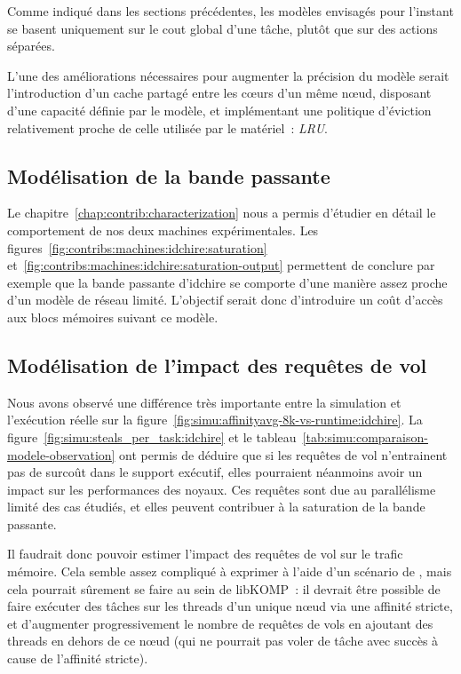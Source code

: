 Comme indiqué dans les sections précédentes, les modèles envisagés pour l'instant se basent uniquement sur le cout global d'une tâche, plutôt que sur des actions séparées.

L'une des améliorations nécessaires pour augmenter la précision du modèle serait l'introduction d'un cache partagé entre les cœurs d'un même nœud, disposant d'une capacité définie par le modèle, et implémentant une politique d'éviction relativement proche de celle utilisée par le matériel~: \emph{LRU}.

\subsection{Modélisation de la bande passante}

Le chapitre~\ref{chap:contrib:characterization} nous a permis d'étudier en détail le comportement de nos deux machines expérimentales.
Les figures~\ref{fig:contribs:machines:idchire:saturation} et~\ref{fig:contribs:machines:idchire:saturation-output} permettent de conclure par exemple que la bande passante d'idchire se comporte d'une manière assez proche d'un modèle de réseau limité.
L'objectif serait donc d'introduire un coût d'accès aux blocs mémoires suivant ce modèle.

\subsection{Modélisation de l'impact des requêtes de vol}

Nous avons observé une différence très importante entre la simulation et l'exécution réelle sur la figure~\ref{fig:simu:affinityavg-8k-vs-runtime:idchire}.
La figure~\ref{fig:simu:steals_per_task:idchire} et le tableau~\ref{tab:simu:comparaison-modele-observation} ont permis de déduire que si les requêtes de vol n'entrainent pas de surcoût dans le support exécutif, elles pourraient néanmoins avoir un impact sur les performances des noyaux.
Ces requêtes sont due au parallélisme limité des cas étudiés, et elles peuvent contribuer à la saturation de la bande passante.

Il faudrait donc pouvoir estimer l'impact des requêtes de vol sur le trafic mémoire.
Cela semble assez compliqué à exprimer à l'aide d'un scénario de \outil, mais cela pourrait sûrement se faire au sein de libKOMP~: il devrait être possible de faire exécuter des tâches sur les threads d'un unique nœud via une affinité stricte, et d'augmenter progressivement le nombre de requêtes de vols en ajoutant des threads en dehors de ce nœud (qui ne pourrait pas voler de tâche avec succès à cause de l'affinité stricte).


